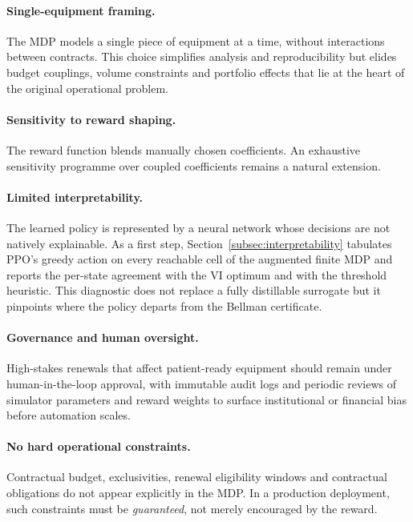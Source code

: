 \paragraph{Single-equipment framing.}
The MDP models a single piece of equipment at a time, without interactions between contracts. This choice simplifies analysis and reproducibility but elides budget couplings, volume constraints and portfolio effects that lie at the heart of the original operational problem.

\paragraph{Sensitivity to reward shaping.}
The reward function blends manually chosen coefficients. An exhaustive sensitivity programme over coupled coefficients remains a natural extension.

\paragraph{Limited interpretability.}
The learned policy is represented by a neural network whose decisions are not natively explainable. As a first step, Section~\ref{subsec:interpretability} tabulates PPO's greedy action on every reachable cell of the augmented finite MDP and reports the per-state agreement with the VI optimum and with the threshold heuristic. This diagnostic does not replace a fully distillable surrogate but it pinpoints where the policy departs from the Bellman certificate.

\paragraph{Governance and human oversight.}
High-stakes renewals that affect patient-ready equipment should remain under human-in-the-loop approval, with immutable audit logs and periodic reviews of simulator parameters and reward weights to surface institutional or financial bias before automation scales.

\paragraph{No hard operational constraints.}
Contractual budget, exclusivities, renewal eligibility windows and contractual obligations do not appear explicitly in the MDP. In a production deployment, such constraints must be \emph{guaranteed}, not merely encouraged by the reward.


